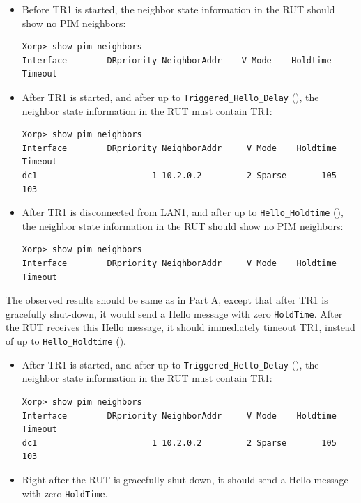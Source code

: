 \documentclass[11pt]{report}
\begin{document}
\begin{itemize}

  \item Before TR1 is started, the neighbor state information in the RUT should
        show no PIM neighbors:

\begin{verbatim}
Xorp> show pim neighbors 
Interface        DRpriority NeighborAddr    V Mode    Holdtime Timeout
\end{verbatim}

  \item After TR1 is started, and after up to \verb=Triggered_Hello_Delay=
        ({\PimsmTriggeredHelloDelay}), the neighbor state information in the
        RUT must contain TR1:

\begin{verbatim}
Xorp> show pim neighbors 
Interface        DRpriority NeighborAddr     V Mode    Holdtime Timeout
dc1                       1 10.2.0.2         2 Sparse       105     103
\end{verbatim}

  \item After TR1 is disconnected from LAN1, and after up to
        \verb=Hello_Holdtime= ({\PimsmHelloHoldtime}), the neighbor state
        information in the RUT should show no PIM neighbors:

\begin{verbatim}
Xorp> show pim neighbors 
Interface        DRpriority NeighborAddr     V Mode    Holdtime Timeout
\end{verbatim}

\end{itemize}


The observed results should be same as in Part A, except that after TR1 is
gracefully shut-down, it would send a Hello message with zero \verb=HoldTime=.
After the RUT receives this Hello message, it should immediately timeout TR1,
instead of up to  \verb=Hello_Holdtime= ({\PimsmHelloHoldtime}).


\begin{itemize}

  \item After TR1 is started, and after up to \verb=Triggered_Hello_Delay=
        ({\PimsmTriggeredHelloDelay}), the neighbor state information in the
        RUT must contain TR1:

\begin{verbatim}
Xorp> show pim neighbors 
Interface        DRpriority NeighborAddr     V Mode    Holdtime Timeout
dc1                       1 10.2.0.2         2 Sparse       105     103
\end{verbatim}

  \item Right after the RUT is gracefully shut-down, it should send
        a Hello message with zero \verb=HoldTime=.

\end{itemize}
\end{document}
